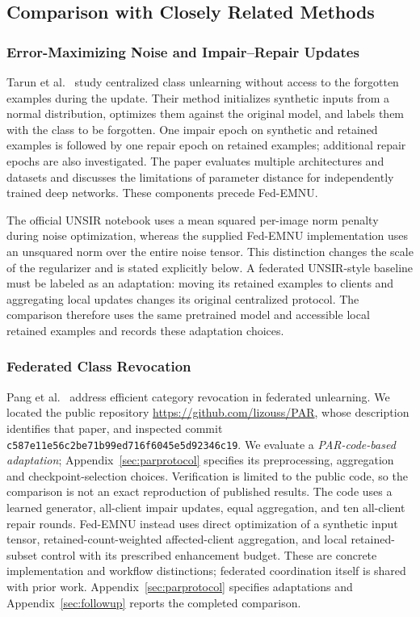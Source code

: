 \documentclass[software,article,submit,moreauthors]{Definitions/mdpi}
\begin{document}
\subsection{Comparison with Closely Related Methods}
\label{sec:related}
\subsubsection{Error-Maximizing Noise and Impair--Repair Updates}


Tarun et al.~\cite{ref20} study centralized class unlearning without access to
the forgotten examples during the update. Their method initializes synthetic
inputs from a normal distribution, optimizes them against the original model,
and labels them with the class to be forgotten. One impair epoch on synthetic
and retained examples is followed by one repair epoch on retained examples;
additional repair epochs are also investigated. The paper evaluates multiple
architectures and datasets and discusses the limitations of parameter distance
for independently trained deep networks. These components precede Fed-EMNU.

The official UNSIR notebook uses a mean squared per-image norm penalty during
noise optimization, whereas the supplied Fed-EMNU implementation uses an
unsquared norm over the entire noise tensor. This distinction changes the scale
of the regularizer and is stated explicitly below. A federated UNSIR-style
baseline must be labeled as an adaptation: moving its retained examples to
clients and aggregating local updates changes its original centralized protocol.
The comparison therefore uses the same pretrained model and accessible local
retained examples and records these adaptation choices.

\subsubsection{Federated Class Revocation}

Pang et al.~\cite{ref21} address efficient category revocation in federated
unlearning. We located the public repository \url{https://github.com/lizouss/PAR},
whose description identifies that paper, and inspected commit
\texttt{c587e11e56c2be71b99ed716f6045e5d92346c19}.
We evaluate a \emph{PAR-code-based adaptation}; Appendix~\ref{sec:parprotocol}
specifies its preprocessing, aggregation and checkpoint-selection choices.
Verification is limited to the public code, so the comparison is not an exact
reproduction of published results.
The code uses a learned generator, all-client impair updates, equal aggregation,
and ten all-client repair rounds. Fed-EMNU instead uses direct optimization of
a synthetic input tensor, retained-count-weighted affected-client aggregation,
and local retained-subset control with its prescribed enhancement budget. These
are concrete implementation and workflow distinctions; federated coordination
itself is shared with prior work. Appendix~\ref{sec:parprotocol} specifies adaptations and
Appendix~\ref{sec:followup} reports the completed comparison.
\end{document}
